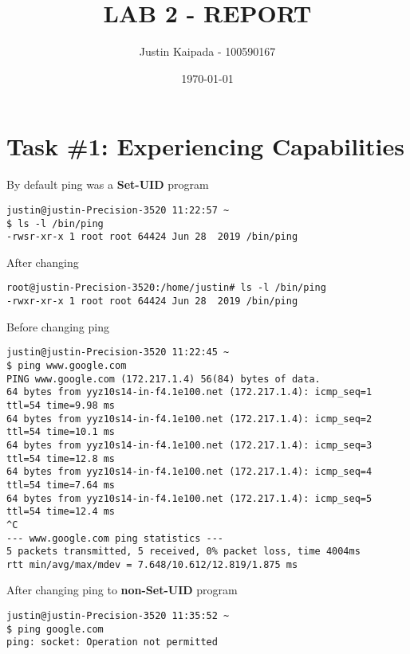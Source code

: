 \documentclass[11pt,letterpaper]{article}
\author{Justin Kaipada - 100590167}
\date{\today}
\title{LAB 2 - REPORT}
\begin{document}
\maketitle
\newpage %

{\parindent0pt %

\section*{Task \#1: Experiencing Capabilities}
\label{sec:org972f51e}

By default ping was a \textbf{Set-UID} program
\lstset{language=cpp,label= ,caption= ,captionpos=b,numbers=none}
\begin{lstlisting}
justin@justin-Precision-3520 11:22:57 ~
$ ls -l /bin/ping
-rwsr-xr-x 1 root root 64424 Jun 28  2019 /bin/ping
\end{lstlisting}

After changing
\lstset{language=cpp,label= ,caption= ,captionpos=b,numbers=none}
\begin{lstlisting}
root@justin-Precision-3520:/home/justin# ls -l /bin/ping
-rwxr-xr-x 1 root root 64424 Jun 28  2019 /bin/ping
\end{lstlisting}

Before changing ping
\lstset{language=cpp,label= ,caption= ,captionpos=b,numbers=none}
\begin{lstlisting}
justin@justin-Precision-3520 11:22:45 ~
$ ping www.google.com
PING www.google.com (172.217.1.4) 56(84) bytes of data.
64 bytes from yyz10s14-in-f4.1e100.net (172.217.1.4): icmp_seq=1 ttl=54 time=9.98 ms
64 bytes from yyz10s14-in-f4.1e100.net (172.217.1.4): icmp_seq=2 ttl=54 time=10.1 ms
64 bytes from yyz10s14-in-f4.1e100.net (172.217.1.4): icmp_seq=3 ttl=54 time=12.8 ms
64 bytes from yyz10s14-in-f4.1e100.net (172.217.1.4): icmp_seq=4 ttl=54 time=7.64 ms
64 bytes from yyz10s14-in-f4.1e100.net (172.217.1.4): icmp_seq=5 ttl=54 time=12.4 ms
^C
--- www.google.com ping statistics ---
5 packets transmitted, 5 received, 0% packet loss, time 4004ms
rtt min/avg/max/mdev = 7.648/10.612/12.819/1.875 ms
\end{lstlisting}

After changing ping to \textbf{non-Set-UID} program
\lstset{language=cpp,label= ,caption= ,captionpos=b,numbers=none}
\begin{lstlisting}
justin@justin-Precision-3520 11:35:52 ~
$ ping google.com
ping: socket: Operation not permitted
\end{lstlisting}

}
\end{document}
